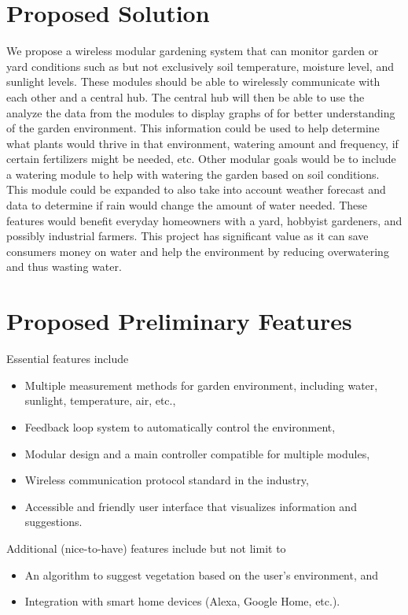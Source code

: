 \documentclass[]{article}
\begin{document}
\section*{Proposed Solution}


	We propose a wireless modular gardening system that can monitor garden or yard conditions such as but not exclusively soil temperature, moisture level, and sunlight levels. These modules should be able to wirelessly communicate with each other and a central hub. The central hub will then be able to use the analyze the data from the modules to display graphs of for better understanding of the garden environment. This information could be used to help determine what plants would thrive in that environment, watering amount and frequency, if certain fertilizers might be needed, etc. Other modular goals would be to include a watering module to help with watering the garden based on soil conditions. This module could be expanded to also take into account weather forecast and data to determine if rain would change the amount of water needed. These features would benefit everyday homeowners with a yard, hobbyist gardeners, and possibly industrial farmers. This project has significant value as it can save consumers money on water and help the environment by reducing overwatering and thus wasting water. 
	

\section*{Proposed Preliminary Features}
\noindent Essential features include
\begin{itemize}
	\item Multiple measurement methods for garden environment, including water, sunlight, temperature, air, etc.,
	\item Feedback loop system to automatically control the environment,
	\item Modular design and a main controller compatible for multiple modules,
	\item Wireless communication protocol standard in the industry,
	\item Accessible and friendly user interface that visualizes information and suggestions.
\end{itemize}
Additional (nice-to-have) features include but not limit to
\begin{itemize}
	\item An algorithm to suggest vegetation based on the user's environment, and
	\item Integration with smart home devices (Alexa, Google Home, etc.).
\end{itemize}
	
\end{document}
